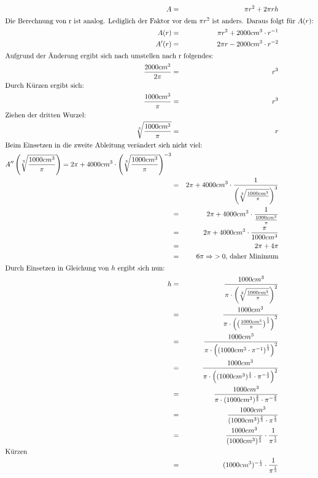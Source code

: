 \documentclass[10pt,a4paper,oneside,ngerman,numbers=noenddot]{scrartcl}
\begin{document}
\begin{alignat*}{2}
A &=& \pi r^{2} + 2 \pi r h \\
\intertext{Die Berechnung von r ist analog. Lediglich der Faktor vor dem $\pi r^{2}$ ist anders. Daraus folgt für $A(r)$:}
A(r) &=& \pi r^{2} + 2000 cm^{3} \cdot r^{-1} \\
A'(r) &=& 2 \pi r - 2000 cm^{3} \cdot r^{-2} \\
\intertext{Aufgrund der Änderung ergibt sich nach umstellen nach r folgendes:}
\frac{2000 cm^{3}}{2 \pi} &=& r^{3} \\
\intertext{Durch Kürzen ergibt sich:}
\frac{1000 cm^{3}}{\pi} &=& r^{3} \\
\intertext{Ziehen der dritten Wurzel:}
\sqrt[3]{\frac{1000 cm^{3}}{\pi}} &=& r \\
\intertext{Beim Einsetzen in die zweite Ableitung verändert sich nicht viel:}
A''\left(\sqrt[3]{\frac{1000 cm^{3}}{\pi}} \right) = 2 \pi + 4000 cm^{3} \cdot \left(\sqrt[3]{\frac{1000 cm^{3}}{\pi}} \right)^{-3} \\
&=& 2 \pi + 4000 cm^{3} \cdot \frac{1}{ \left(\sqrt[3]{\frac{1000 cm^{3}}{\pi}} \right)^{3}} \\
&=& 2 \pi + 4000 cm^{3} \cdot \frac{1}{ \frac{1000 cm^{3}}{\pi}} \\
&=& 2 \pi + 4000 cm^{3} \cdot \frac{\pi}{ 1000 cm^{3}} \\
&=& 2 \pi + 4 \pi \\
&=& 6 \pi \Rightarrow \text{$>0$, daher Minimum}\\
\intertext{Durch Einsetzen in Gleichung von $h$ ergibt sich nun:}
h &=& \frac{1000 cm^{3}}{\pi \cdot  \left(\sqrt[3]{\frac{1000 cm^{3}}{\pi}} \right)^{2}} \\
&=& \frac{1000 cm^{3}}{\pi \cdot  \left(\left(\frac{1000 cm^{3}}{\pi}\right)^{\frac{1}{3}} \right)^{2}} \\
&=& \frac{1000 cm^{3}}{\pi \cdot  \left(\left(1000 cm^{3} \cdot \pi^{-1} \right)^{\frac{1}{3}} \right)^{2}} \\
&=& \frac{1000 cm^{3}}{\pi \cdot  \left((1000 cm^{3})^{\frac{1}{3}} \cdot \pi^{-\frac{1}{3}}\right)^{2}} \\
&=& \frac{1000 cm^{3}}{\pi \cdot (1000 cm^{3})^{\frac{2}{3}} \cdot \pi^{-\frac{2}{3}}} \\
&=& \frac{1000 cm^{3}}{(1000 cm^{3})^{\frac{2}{3}} \cdot \pi^{\frac{1}{3}}} \\
&=& \frac{1000 cm^{3}}{(1000 cm^{3})^{\frac{2}{3}}} \cdot \frac{1}{\pi^{\frac{1}{3}}} \\
\intertext{Kürzen}
&=& (1000 cm^{3})^{-\frac{1}{3}} \cdot \frac{1}{\pi^{\frac{1}{3}}}
\end{alignat*}
\end{document}
